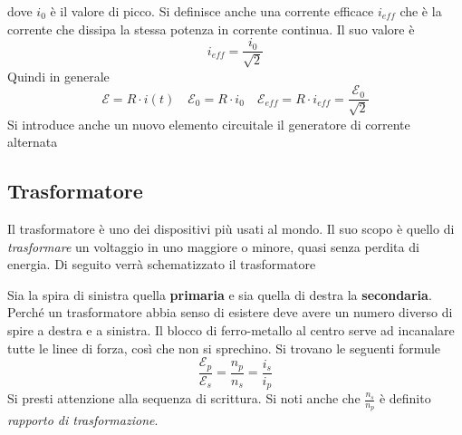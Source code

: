 dove $i_0$ è il valore di picco. Si definisce anche una corrente efficace $i_{eff}$ che è la
corrente che dissipa la stessa potenza in corrente continua. Il suo valore è
\begin{equation*}
  i_{eff} = \frac{i_0}{\sqrt{2}}
\end{equation*}
Quindi in generale
\begin{equation*}
  \mathcal{E} = R\cdot i(t)\quad\mathcal{E}_0=R\cdot i_0\quad\mathcal{E}_{eff}=R\cdot i_{eff}=
  \frac{\mathcal{E}_0}{\sqrt{2}}
\end{equation*}
Si introduce anche un nuovo elemento circuitale il generatore di corrente alternata
\begin{center}
\end{center}

\subsection{Trasformatore}
Il trasformatore è uno dei dispositivi più usati al mondo. Il suo scopo è quello di 
\emph{trasformare} un voltaggio in uno maggiore o minore, quasi senza perdita di energia. Di 
seguito verrà schematizzato il trasformatore
\begin{center}
\end{center}
Sia la spira di sinistra quella \textbf{primaria} e sia quella di destra la \textbf{secondaria}.
Perché un trasformatore abbia senso di esistere deve avere un numero diverso di spire a destra
e a sinistra. Il blocco di ferro-metallo al centro serve ad incanalare tutte le linee di forza, 
così che non si sprechino. Si trovano le seguenti formule
\begin{equation*}
  \frac{\mathcal{E}_p}{\mathcal{E}_s} = \frac{n_p}{n_s} = \frac{i_s}{i_p}
\end{equation*}
Si presti attenzione alla sequenza di scrittura.
Si noti anche che $\frac{n_s}{n_p}$ è definito \emph{rapporto di trasformazione}.
